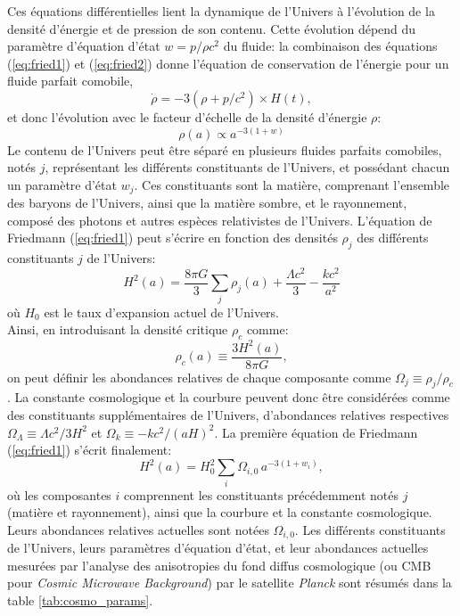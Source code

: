 Ces équations différentielles lient la dynamique de l'Univers à l'évolution de la densité d'énergie et de pression de son contenu.
Cette évolution dépend du paramètre d'équation d'état $w=p/\rho c^2$ du fluide: la combinaison des équations (\ref{eq:fried1}) et (\ref{eq:fried2}) donne l'équation de conservation de l'énergie pour un fluide parfait comobile,
\begin{equation}
    \dot{\rho} = -3(\rho + p/c^2) \times H(t),
\end{equation}
et donc l'évolution avec le facteur d'échelle de la densité d'énergie $\rho$:
\begin{equation}
    \label{eq:rho_w}
    \rho(a) \propto a^{-3(1+w)}
\end{equation}
Le contenu de l'Univers peut être séparé en plusieurs fluides parfaits comobiles, notés $j$, représentant les différents constituants de l'Univers, et possédant chacun un paramètre d'état $w_j$.
Ces constituants sont la matière, comprenant l'ensemble des baryons de l'Univers, ainsi que la matière sombre, et le rayonnement, composé des photons et autres espèces relativistes de l'Univers.
L'équation de Friedmann (\ref{eq:fried1}) peut s'écrire en fonction des densités $\rho_j$ des différents constituants $j$ de l'Univers:
\begin{equation}
    H^2(a) = \frac{8\pi G}{3 }\sum_j \rho_j(a) + \frac{\Lambda c^2}{3} - \frac{kc^2}{a^2}
\end{equation}
où $H_0$ est le taux d'expansion actuel de l'Univers. \\
Ainsi, en introduisant la densité critique $\rho_c$ comme:
\begin{equation}
    \label{eq:rho_crit}
    \rho_c(a) \equiv \frac{3 H^2(a)}{8 \pi G},
\end{equation}
on peut définir les abondances relatives de chaque composante comme $\Omega_j \equiv \rho_j / \rho_c$.
La constante cosmologique et la courbure peuvent donc être considérées comme des constituants supplémentaires de l'Univers, d'abondances relatives respectives $\Omega_\Lambda \equiv \Lambda c^2 / 3H^2$ et $\Omega_k \equiv -kc^2 / (aH)^2$.
La première équation de Friedmann (\ref{eq:fried1}) s'écrit finalement:
\begin{equation}
    \label{eq:fried_omega}
    H^2(a) = H_0^2 \sum_i \Omega_{i,0} \, a^{-3(1+w_i)},
\end{equation}
où les composantes $i$ comprennent les constituants précédemment notés $j$ (matière et rayonnement), ainsi que la courbure et la constante cosmologique.
Leurs abondances relatives actuelles sont notées $\Omega_{i,0}$.
Les différents constituants de l'Univers, leurs paramètres d'équation d'état, et leur abondances actuelles mesurées par l'analyse des anisotropies du fond diffus cosmologique (ou CMB pour \textit{Cosmic Microwave Background}) par le satellite \textit{Planck} \cite{planck_collaboration_planck_2020} sont résumés dans la table \ref{tab:cosmo_params}.

